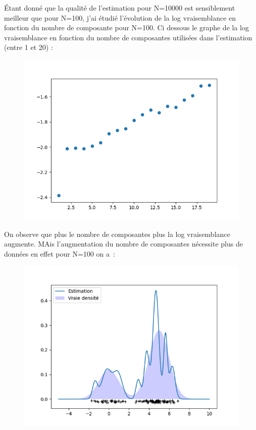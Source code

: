 \documentclass[12pt]{scrartcl} %
\begin{document}
\newline 
Étant donné que la qualité de l'estimation pour N=10000 est sensiblement meilleur que pour N=100, j'ai étudié l'évolution de la log vraisemblance en fonction du nombre de composante pour N=100. Ci dessous le graphe de la log vraisemblance en fonction du nombre de composantes utilisées dans l'estimation (entre 1 et 20) : 
\newline
\begin{figure}[!h]
 \centering 
\includegraphics[scale=.3]{log100.png}
\end{figure}
\newline 
On observe que plus le nombre de composantes plus la log vraisemblance augmente. MAis l'augmentation du nombre de composantes nécessite plus de données en effet pour N=100 on a~:
\newline
\begin{figure}[!h]
 \centering 
\includegraphics[scale=.3]{densite8cpt.png}
\end{figure}
\end{document}
